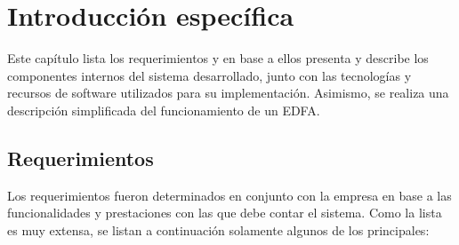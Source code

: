 \chapter{Introducción específica} %

\label{Chapter2}


Este capítulo lista los requerimientos y en base a ellos presenta y describe los componentes internos del sistema desarrollado, junto con las tecnologías y recursos de software utilizados para su implementación. Asimismo, se realiza una descripción simplificada del funcionamiento de un EDFA.

\section{Requerimientos}
\label{sec:reqs}

Los requerimientos fueron determinados en conjunto con la empresa en base a las funcionalidades y prestaciones con las que debe contar el sistema. Como la lista es muy extensa, se listan a continuación solamente algunos de los principales:

\renewcommand{\labelenumii}{\arabic{enumi}.\arabic{enumii}}


